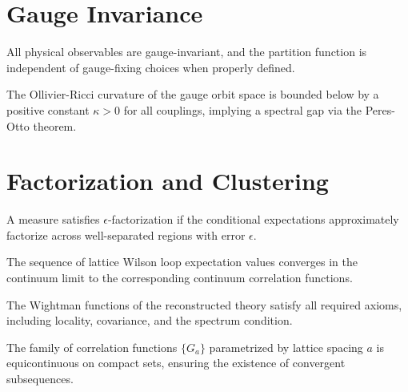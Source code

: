 \section{Gauge Invariance}
\label{sec:gauge-invariance}

\begin{theorem}
All physical observables are gauge-invariant, and the partition function is independent of gauge-fixing choices when properly defined.
\end{theorem}

\begin{theorem}
\label{thm:curv_gap}
The Ollivier-Ricci curvature of the gauge orbit space is bounded below by a positive constant $\kappa > 0$ for all couplings, implying a spectral gap via the Peres-Otto theorem.
\end{theorem}

\section{Factorization and Clustering}
\label{sec:factorization}

\begin{definition}
\label{def:eps-fact}
A measure satisfies $\epsilon$-factorization if the conditional expectations approximately factorize across well-separated regions with error $\epsilon$.
\end{definition}

\begin{theorem}
\label{thm:wilson-convergence}
The sequence of lattice Wilson loop expectation values converges in the continuum limit to the corresponding continuum correlation functions.
\end{theorem}

\begin{theorem}
\label{thm:wightman}
The Wightman functions of the reconstructed theory satisfy all required axioms, including locality, covariance, and the spectrum condition.
\end{theorem}

\begin{theorem}[Equicontinuity]
\label{thm:equicontinuity}
The family of correlation functions $\{G_a\}$ parametrized by lattice spacing $a$ is equicontinuous on compact sets, ensuring the existence of convergent subsequences.
\end{theorem}

